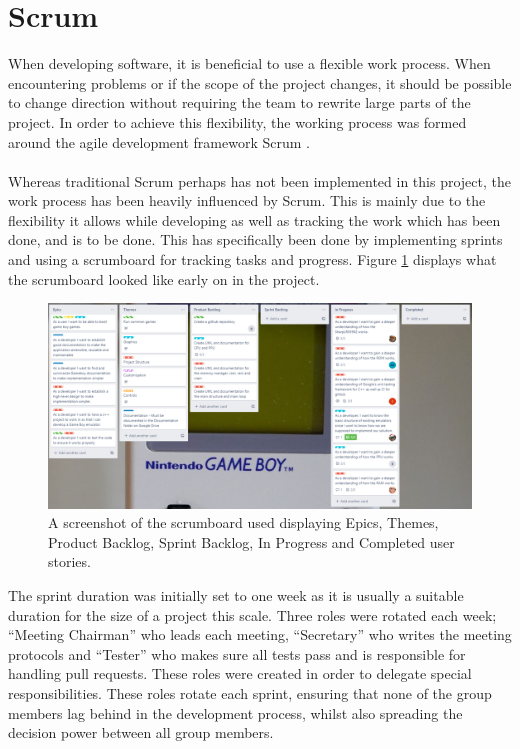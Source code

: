 \section{Scrum}
When developing software, it is beneficial to use a flexible work process. When encountering problems or if the scope of the project changes, it should be possible to change direction without requiring the team to rewrite large parts of the project. In order to achieve this flexibility, the working process was formed around the agile development framework Scrum \cite{Scrum}.
\\\\
Whereas traditional Scrum perhaps has not been implemented in this project, the work process has been heavily influenced by Scrum. This is mainly due to the flexibility it allows while developing as well as tracking the work which has been done, and is to be done. This has specifically been done by implementing sprints and using a scrumboard for tracking tasks and progress. Figure \ref{fig:scrumboard} displays what the scrumboard looked like early on in the project.

\begin{figure}[H]
    \centering
    \includegraphics[width=\textwidth]{figures/Scrumboard.PNG}
    \caption{A screenshot of the scrumboard used displaying Epics, Themes, Product Backlog, Sprint Backlog, In Progress and Completed user stories.}
    \label{fig:scrumboard}
\end{figure}

The sprint duration was initially set to one week as it is usually a suitable duration for the size of a project this scale. Three roles were rotated each week; ``Meeting Chairman'' who leads each meeting, ``Secretary'' who writes the meeting protocols and ``Tester'' who makes sure all tests pass and is responsible for handling pull requests. These roles were created in order to delegate special responsibilities. These roles rotate each sprint, ensuring that none of the group members lag behind in the development process, whilst also spreading the decision power between all group members. 

